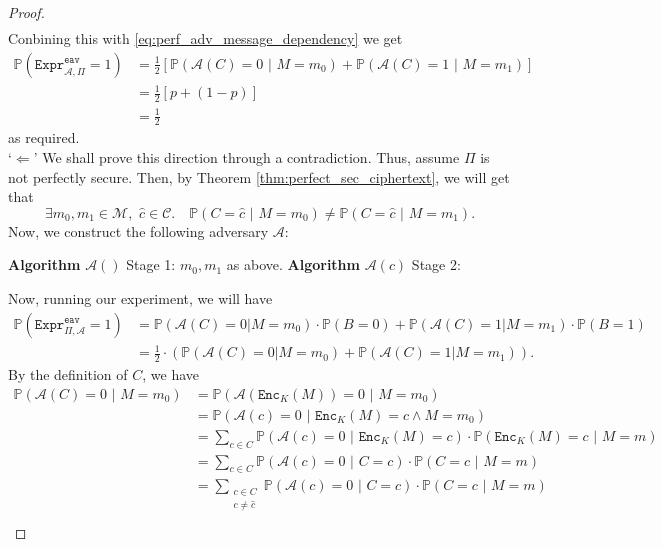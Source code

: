 \documentclass{article}
\theoremstyle{definition}
\theoremstyle{example}
\newcommand{\Enc}{\texttt{Enc}}
\newcommand{\M}{\mathcal{M}}
\renewcommand{\C}{\mathcal{C}}
\newcommand{\A}{\mathcal{A}}
\newcommand{\Prob}{\mathbb{P}}
\newcommand{\Expr}[2]{\texttt{Expr}^{\texttt{#1}}_{#2}}
\begin{document}
\begin{proof}
\begin{gather*}
  \end{gather*}
  Conbining this with \ref{eq:perf_adv_message_dependency} we get
  \begin{align*}
    \Prob(\Expr{eav}{\A, \Pi} = 1) &= \frac12 \left[ \Prob(\A(C) = 0 \,\,|\,\, M = m_0) + \Prob(\A(C) = 1 \,\,|\,\, M = m_1) \right]\\
                                   &= \frac12 [p + (1 - p)] \\
                                   &= \frac12
  \end{align*}
  as required.\\
  `$\Leftarrow$' We shall prove this direction through a contradiction. Thus,
  assume $\Pi$ is not perfectly secure. Then, by Theorem
  \ref{thm:perfect_sec_ciphertext}, we will get that
  \[
    \exists m_0, m_1 \in \M,\,\, \hat{c} \in \C.\quad \Prob(C =
    \hat{c}\,\,|\,\,M = m_0) \neq \Prob(C =
    \hat{c}\,\,|\,\,M = m_1).
  \]
  Now, we construct the following adversary $\A$:\\
  \begin{algorithmic}
    \State \textbf{Algorithm} $\A()$ Stage 1:
    \State \Return $m_0, m_1$ as above.
    \State
    \State \textbf{Algorithm} $\A(c)$ Stage 2:
    \EndIf
    \State
  \end{algorithmic}
  Now, running our experiment, we will have
  \begin{align*}
    \Prob(\Expr{eav}{\Pi, \A} = 1) &= \Prob(\A(C) = 0 | M = m_0)\cdot\Prob(B = 0) + \Prob(\A(C) = 1 | M = m_1)\cdot\Prob(B = 1)\\
                                   &= \frac12 \cdot (\Prob(\A(C) = 0 | M = m_0) + \Prob(\A(C) = 1 | M = m_1)).
  \end{align*}
  By the definition of $C$, we have
  \begin{align*}
    \Prob(\A(C) = 0 \,\,|\,\, M = m_0) &= \Prob(\A(\Enc_K(M)) = 0 \,\,|\,\, M = m_0)\\
                                   &= \Prob(\A(c) = 0 \,\,|\,\, \Enc_K(M) = c \land M = m_0) \\
                                   &= \sum_{c\in C} \Prob(\A(c) = 0 \,\,|\,\, \Enc_K(M) = c)\cdot \Prob(\Enc_K(M) =c\,\,|\,\, M = m)\\
                                   &=\sum_{c\in C} \Prob(\A(c) = 0 \,\,|\,\, C = c)\cdot \Prob(C = c\,\,|\,\, M = m) \\
                                   &=\sum_{\substack{c\in C \\ c \neq \hat{c}}} \Prob(\A(c) = 0 \,\,|\,\, C = c) \cdot \Prob(C = c\,\,|\,\, M = m) \\

\end{align*}
\end{proof}
\end{document}

